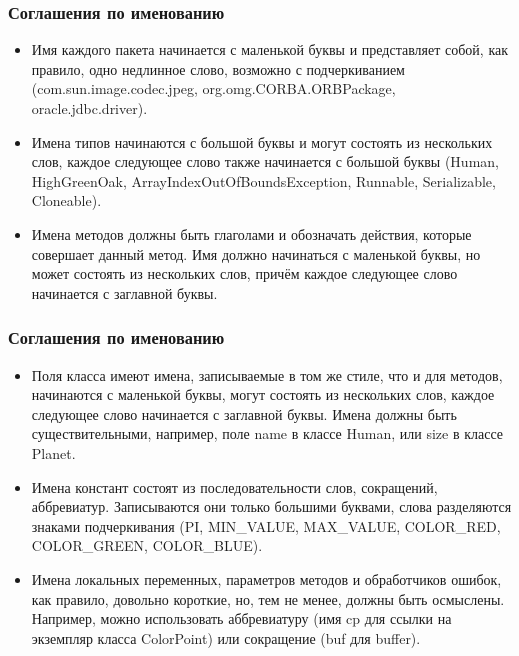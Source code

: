 \documentclass[default]{beamer}
\begin{document}
	\begin{frame}
		\frametitle{Соглашения по именованию}
		
		\begin{itemize}
			\item Имя каждого пакета начинается с маленькой буквы и представляет собой, как правило, одно недлинное слово, возможно с подчеркиванием (com.sun.image.codec.jpeg, org.omg.CORBA.ORBPackage, oracle.jdbc.driver).
			\item Имена типов начинаются с большой буквы и могут состоять из нескольких слов, каждое следующее слово также начинается с большой буквы (Human, HighGreenOak, ArrayIndexOutOfBoundsException, Runnable, Serializable, Cloneable).
			\item Имена методов должны быть глаголами и обозначать действия, которые совершает данный метод. Имя должно начинаться с маленькой буквы, но может состоять из нескольких слов, причём каждое следующее слово начинается с заглавной буквы.
		\end{itemize}
	\end{frame}
	
	\begin{frame}
		\frametitle{Соглашения по именованию}
		
		\begin{itemize}
			\item Поля класса имеют имена, записываемые в том же стиле, что и для методов, начинаются с маленькой буквы, могут состоять из нескольких слов, каждое следующее слово начинается с заглавной буквы. Имена должны быть существительными, например, поле name в классе Human, или size в классе Planet.
			\item Имена констант состоят из последовательности слов, сокращений, аббревиатур. Записываются они только большими буквами, слова разделяются знаками подчеркивания (PI, MIN\_VALUE, MAX\_VALUE, COLOR\_RED, COLOR\_GREEN, COLOR\_BLUE).
			\item Имена локальных переменных, параметров методов и обработчиков ошибок, как правило, довольно короткие, но, тем не менее, должны быть осмыслены. Например, можно использовать аббревиатуру (имя cp для ссылки на экземпляр класса ColorPoint) или сокращение (buf для buffer).
		\end{itemize}
	\end{frame}
\end{document}
